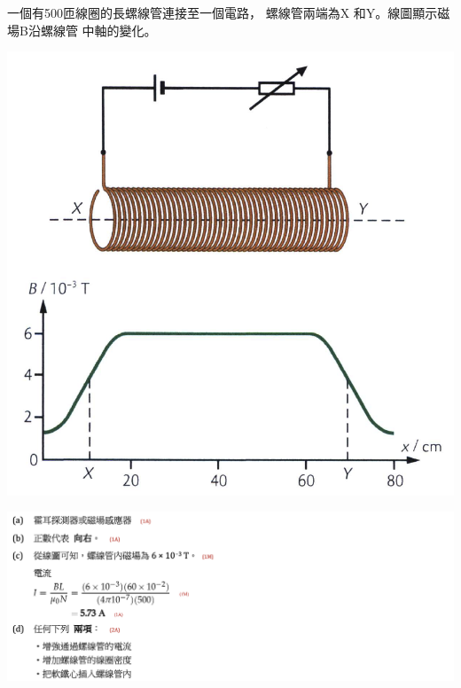 {
    一個有500匝線圈的長螺線管連接至一個電路， 螺線管兩端為X 和Y。線圖顯示磁場B沿螺線管 中軸的變化。
    \par{\par\centering\includegraphics[width=.4\textwidth]{./img/ch4_magnetostatics_lq_2024-06-23-21-10-45.png}\par}
}{
    \par{\par\centering\includegraphics[width=\textwidth]{./img/ch4_magnetostatics_lq_2024-06-23-21-18-04.png}\par}
}

